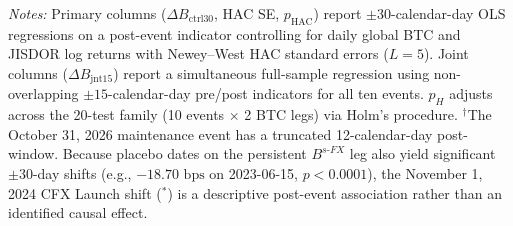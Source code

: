 \begin{table}[htbp]
\begin{minipage}{\textwidth}
\emph{Notes:} Primary columns ($\Delta B_{\text{ctrl30}}$, HAC SE, $p_{\text{HAC}}$) report $\pm 30$-calendar-day OLS regressions on a post-event indicator controlling for daily global BTC and JISDOR log returns with Newey--West HAC standard errors ($L=5$). Joint columns ($\Delta B_{\text{jnt15}}$) report a simultaneous full-sample regression using non-overlapping $\pm 15$-calendar-day pre/post indicators for all ten events. $p_H$ adjusts across the 20-test family (10 events $\times$ 2 BTC legs) via Holm's procedure. $^\dagger$The October 31, 2026 maintenance event has a truncated 12-calendar-day post-window. Because placebo dates on the persistent $B^{s\text{-}FX}$ leg also yield significant $\pm 30$-day shifts (e.g., $-18.70\text{ bps}$ on 2023-06-15, $p<0.0001$), the November 1, 2024 CFX Launch shift ($^*$) is a descriptive post-event association rather than an identified causal effect.
\end{minipage}
\end{table}
